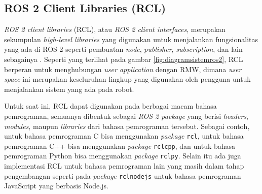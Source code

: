 \subsection{ROS 2 Client Libraries (RCL)}
\label{subsec:rcl}

\emph{ROS 2 client libraries} (RCL), atau \emph{ROS 2 client interfaces},
  merupakan sekumpulan \emph{high-level libraries} yang digunakan untuk menjalankan fungsionalitas yang ada di ROS 2 seperti pembuatan \emph{node}, \emph{publisher}, \emph{subscription}, dan lain sebagainya \citep{url:rclconcept}.
Seperti yang terlihat pada gambar \ref{fig:diagramsistemros2},
  RCL berperan untuk menghubungan \emph{user application} dengan RMW,
  dimana \emph{user space} ini merupakan keseluruhan lingkup yang digunakan oleh pengguna untuk menjalankan sistem yang ada pada robot.

Untuk saat ini, RCL dapat digunakan pada berbagai macam bahasa pemrograman,
  semuanya dibentuk sebagai \emph{ROS 2 package} yang berisi \emph{headers},
  \emph{modules}, maupun \emph{libraries} dari bahasa pemrograman tersebut.
Sebagai contoh, untuk bahasa pemrograman C bisa menggunakan \emph{package} \lstinline{rcl},
  untuk bahasa pemrograman C++ bisa menggunakan \emph{package} \lstinline{rclcpp},
  dan untuk bahasa pemrograman Python bisa menggunakan \emph{package} \lstinline{rclpy}.
Selain itu ada juga implementasi RCL untuk bahasa pemrograman lain yang masih dalam tahap pengembangan seperti pada \emph{package} \lstinline{rclnodejs} \citep{url:rclnodejs} untuk bahasa pemrograman JavaScript yang berbasis Node.js.
